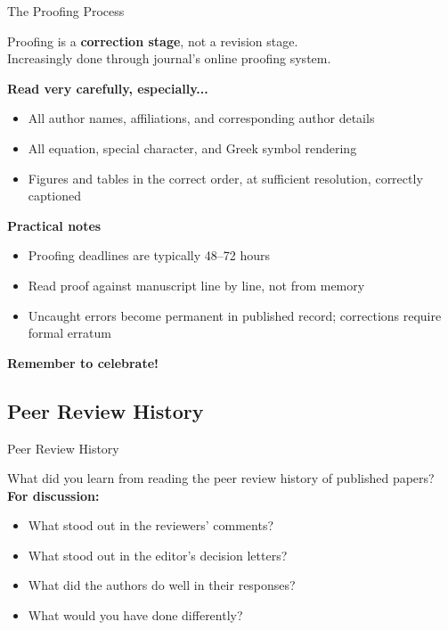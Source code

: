 \documentclass{beamer}
\begin{document}
\begin{frame}{The Proofing Process}

  \footnotesize
  \medskip
  Proofing is a \textbf{correction stage}, not a revision stage.\\
  Increasingly done through journal's online proofing system.

  \medskip
  \textbf{Read very carefully, especially...}
  \begin{itemize}
    \item All author names, affiliations, and corresponding
      author details
    \item All equation, special character, and Greek symbol
      rendering
    \item Figures and tables in the correct order, at
      sufficient resolution, correctly captioned
  \end{itemize}

  \medskip
  \textbf{Practical notes}
  \begin{itemize}
    \item Proofing deadlines are typically 48--72 hours
    \item Read proof against manuscript line by line, not from memory
    \item Uncaught errors become permanent in published record; corrections require formal erratum
  \end{itemize}

  \begin{center}
  {\large \alert{\textbf{Remember to celebrate!}} }
  \end{center}

\end{frame}


\subsection{Peer Review History}

\begin{frame}{Peer Review History}

  
  What did you learn from reading the peer review history of published papers?\\

  \medskip
  \textbf{For discussion:}
  \begin{itemize}
    \item What stood out in the reviewers' comments?
    \item What stood out in the editor's decision letters?
    \item What did the authors do well in their responses?
    \item What would you have done differently?
  \end{itemize}


\end{frame}
\end{document}
